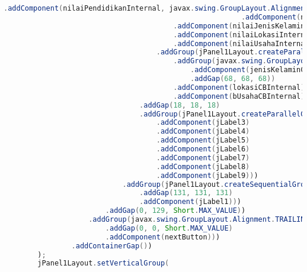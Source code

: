 \begin{lstlisting}[language=Java, caption=TampilanBobotKetetanggaan.java]
                                                        .addComponent(nilaiPendidikanInternal, javax.swing.GroupLayout.Alignment.TRAILING, javax.swing.GroupLayout.PREFERRED_SIZE, 53, javax.swing.GroupLayout.PREFERRED_SIZE)
                                                        .addComponent(nilaiPendapatanInternal, javax.swing.GroupLayout.Alignment.TRAILING, javax.swing.GroupLayout.PREFERRED_SIZE, 53, javax.swing.GroupLayout.PREFERRED_SIZE)))))
                                        .addComponent(nilaiJenisKelaminInternal, javax.swing.GroupLayout.PREFERRED_SIZE, 53, javax.swing.GroupLayout.PREFERRED_SIZE)
                                        .addComponent(nilaiLokasiInternal, javax.swing.GroupLayout.PREFERRED_SIZE, 53, javax.swing.GroupLayout.PREFERRED_SIZE)
                                        .addComponent(nilaiUsahaInternal, javax.swing.GroupLayout.PREFERRED_SIZE, 53, javax.swing.GroupLayout.PREFERRED_SIZE))
                                    .addGroup(jPanel1Layout.createParallelGroup(javax.swing.GroupLayout.Alignment.LEADING)
                                        .addGroup(javax.swing.GroupLayout.Alignment.TRAILING, jPanel1Layout.createSequentialGroup()
                                            .addComponent(jenisKelaminCBInternal)
                                            .addGap(68, 68, 68))
                                        .addComponent(lokasiCBInternal)
                                        .addComponent(bUsahaCBInternal)))
                                .addGap(18, 18, 18)
                                .addGroup(jPanel1Layout.createParallelGroup(javax.swing.GroupLayout.Alignment.LEADING)
                                    .addComponent(jLabel3)
                                    .addComponent(jLabel4)
                                    .addComponent(jLabel5)
                                    .addComponent(jLabel6)
                                    .addComponent(jLabel7)
                                    .addComponent(jLabel8)
                                    .addComponent(jLabel9)))
                            .addGroup(jPanel1Layout.createSequentialGroup()
                                .addGap(131, 131, 131)
                                .addComponent(jLabel1)))
                        .addGap(0, 129, Short.MAX_VALUE))
                    .addGroup(javax.swing.GroupLayout.Alignment.TRAILING, jPanel1Layout.createSequentialGroup()
                        .addGap(0, 0, Short.MAX_VALUE)
                        .addComponent(nextButton)))
                .addContainerGap())
        );
        jPanel1Layout.setVerticalGroup(

\end{lstlisting}
